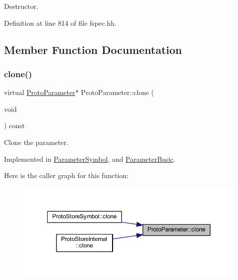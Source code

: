 Destructor. 



Definition at line 814 of file fspec.\+hh.



\subsection{Member Function Documentation}
\mbox{\label{class_proto_parameter_a3f09d39a3c5f10b368753eaa0391bea8}} 
\subsubsection{\texorpdfstring{clone()}{clone()}}
{\footnotesize\ttfamily virtual \mbox{\hyperlink{class_proto_parameter}{Proto\+Parameter}}$\ast$ Proto\+Parameter\+::clone (\begin{DoxyParamCaption}\item[{void}]{ }\end{DoxyParamCaption}) const\hspace{0.3cm}{\ttfamily [pure virtual]}}



Clone the parameter. 



Implemented in \mbox{\hyperlink{class_parameter_symbol_a53389b2a06d6ee2bd0ece306a70dc360}{Parameter\+Symbol}}, and \mbox{\hyperlink{class_parameter_basic_af5f84234790a83cb3ca98c7155730355}{Parameter\+Basic}}.

Here is the caller graph for this function\+:
\nopagebreak
\begin{figure}[H]
\begin{center}
\leavevmode
\includegraphics[width=350pt]{class_proto_parameter_a3f09d39a3c5f10b368753eaa0391bea8_icgraph}
\end{center}
\end{figure}
\mbox{\label{class_proto_parameter_a33c604ed7e06ae0ca6ac491b46739343}} 
